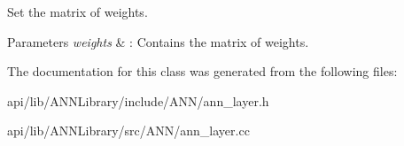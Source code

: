 Set the matrix of weights. 


\begin{DoxyParams}{Parameters}
{\em weights} & \+: Contains the matrix of weights. \\
\hline
\end{DoxyParams}


The documentation for this class was generated from the following files\+:\begin{DoxyCompactItemize}
\item 
api/lib/\+A\+N\+N\+Library/include/\+A\+N\+N/ann\+\_\+layer.\+h\item 
api/lib/\+A\+N\+N\+Library/src/\+A\+N\+N/ann\+\_\+layer.\+cc\end{DoxyCompactItemize}
